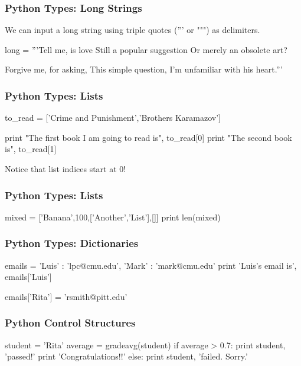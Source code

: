 \begin{frame}[fragile]
\frametitle{Python Types: Long Strings}

We can input a long string using triple quotes (''' or """) as delimiters.

\begin{python}
long = '''Tell me, is love
Still a popular suggestion
Or merely an obsolete art?

Forgive me, for asking,
This simple question,
I'm unfamiliar with his heart.'''
\end{python}
\end{frame}

\begin{frame}[fragile]
\frametitle{Python Types: Lists}
\begin{python}
to_read = ['Crime and Punishment','Brothers Karamazov']

print "The first book I am going to read is", to_read[0]
print "The second book is", to_read[1]

\end{python}

Notice that list indices start at \alert{0}!

\end{frame}

\begin{frame}[fragile]
\frametitle{Python Types: Lists}

\begin{python}
mixed = ['Banana',100,['Another','List'],[]]
print len(mixed)
\end{python}
\end{frame}

\begin{frame}[fragile]
\frametitle{Python Types: Dictionaries}
\begin{python}
emails = { 'Luis' : 'lpc@cmu.edu',
           'Mark' : 'mark@cmu.edu' }
print 'Luis's email is', emails['Luis']

emails['Rita'] = 'rsmith@pitt.edu'
\end{python}

\end{frame}

\begin{frame}[fragile]
\frametitle{Python Control Structures}

\begin{python}
student = 'Rita'
average = gradeavg(student)
if average > 0.7:
    print student, 'passed!'
    print 'Congratulations!!'
else:
    print student, 'failed. Sorry.'
\end{python}
\end{frame}

